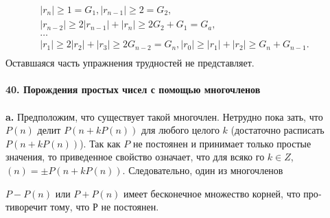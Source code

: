 		$$\begin{array}{ccccc}
				|r_n| \geq 1 = G_1, |r_{n-1}| \geq 2 = G_2,\\
				|r_{n-2}| \geq 2|r_{n-1}| + |r_n| \geq 2G_2 + G_1 = G_a,\\
				\ldots                                                                                        & \\
				|r_1| \geq 2|r_2|+ |r_3| \geq 2G_{n-2} = G_n, |r_0| \geq |r_1| + |r_2| \geq G_n + G_{n-1}.\\
		\end{array}$$
Оставшаяся часть упражнения трудностей не представляет.\\
\\
\noindent\textbf{40. Порождения простых чисел с помощью многочленов}\\
\\
\hspace*{15pt}\textbf{a.} Предположим, что существует такой многочлен. Нетрудно пока­\linebreak
зать, что $P(n)$ делит $P(n + kP(n))$ для любого целого $k$ (достаточно\linebreak
расписать $P(n + kP(n))$). Так как $P$ не постоянен и принимает только\linebreak
простые значения, то приведенное свойство означает, что для всяко­\linebreak
го $k \in Z$, $(n) = \pm P(n + kP(n)).$  Следовательно, один из многочленов\linebreak

\pagebreak
\noindent$P - P(n)$ или $P + P(n)$ имеет бесконечное множество корней, что про­\linebreak
тиворечит тому, что Р не постоянен.

